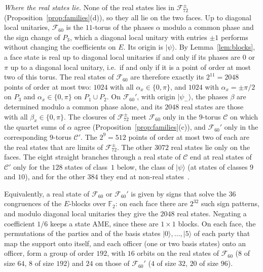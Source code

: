 \documentclass[aps,pra,reprint,superscriptaddress,amsmath,amssymb,longbibliography]{revtex4-2}
\newcommand{\ket}[1]{\lvert #1\rangle}
\theoremstyle{plain}
\begin{document}
\emph{Where the real states lie.}  None of the real states lies in $\mathcal F_{72}^\pm$
(Proposition~\ref{prop:families}(d)), so they all lie on the two faces.  Up to diagonal local unitaries, $\mathcal F_{60}$ is
the $11$-torus of the phases $\alpha$ modulo a common phase and the sign change of $P_3$, which a diagonal local
unitary with entries $\pm1$ performs without changing the coefficients on $E$.  Its origin is $\ket\psi$.  By
Lemma~\ref{lem:blocks}, a face state is real up to diagonal local unitaries if and only if its phases are $0$ or $\pi$
up to a diagonal local unitary, i.e.\ if and only if it is a point of order at most two of this torus.  The real states of
$\mathcal F_{60}$ are therefore exactly its $2^{11}=2048$ points of order at most two: $1024$ with all
$\alpha_x\in\{0,\pi\}$, and $1024$ with $\alpha_x=\pm\pi/2$ on $P_3$ and $\alpha_x\in\{0,\pi\}$ on $P_1\cup P_2$.  On
$\mathcal F_{60}'$, with origin $\ket{\psi_-}$, the phases $\beta$ are determined modulo a common phase alone, and its
$2048$ real states are those with all $\beta_x\in\{0,\pi\}$.  The closures of $\mathcal F_{72}^\pm$ meet
$\mathcal F_{60}$ only in the $9$-torus $\mathcal C$ on which the quartet sums of $\alpha$ agree
(Proposition~\ref{prop:families}(c)), and $\mathcal F_{60}'$ only in the corresponding $9$-torus $\mathcal C'$.  The $2^9=512$ points of order at most two of each are the real states that are
limits of $\mathcal F_{72}^\pm$.  The other $3072$ real states lie only on the faces.  The eight straight branches through a
real state of $\mathcal C$ end at real states of $\mathcal C'$ only for the $128$ states of class~$1$ below, the class
of $\ket\psi$ (at states of classes $9$ and $10$), and for the other $384$ they end at non-real states~\cite{repo}.

Equivalently, a real state of $\mathcal F_{60}$ or $\mathcal F_{60}'$ is given by signs that solve the $36$ congruences of
the $E$-blocks over $\mathbb F_2$: on each face there are $2^{32}$ such sign patterns, and modulo
diagonal local unitaries they give the $2048$ real states.  Negating a coefficient $1/6$ keeps a state AME, since these are $1\times1$ blocks.  On each
face, the permutations of the parties and of the basis states $\ket0,\dots,\ket5$ of each party that map the support onto itself, and each officer (one or two basis states) onto an officer, form a
group of order $192$, with $16$ orbits on the real states of $\mathcal F_{60}$ ($8$ of size $64$, $8$ of size $192$) and
$24$ on those of $\mathcal F_{60}'$ ($4$ of size $32$, $20$ of size $96$).
\end{document}
